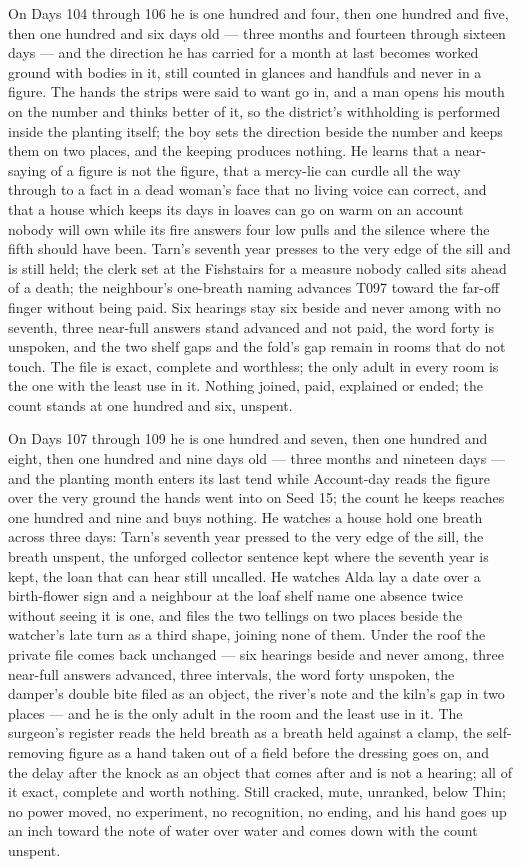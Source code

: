 \documentclass{design/chronicle}
\begin{document}
{On Days 104 through 106 he is one hundred and four, then one hundred and five, then one hundred and six days old — three months and fourteen through sixteen days — and the direction he has carried for a month at last becomes worked ground with bodies in it, still counted in glances and handfuls and never in a figure. The hands the strips were said to want go in, and a man opens his mouth on the number and thinks better of it, so the district’s withholding is performed inside the planting itself; the boy sets the direction beside the number and keeps them on two places, and the keeping produces nothing. He learns that a near-saying of a figure is not the figure, that a mercy-lie can curdle all the way through to a fact in a dead woman’s face that no living voice can correct, and that a house which keeps its days in loaves can go on warm on an account nobody will own while its fire answers four low pulls and the silence where the fifth should have been. Tarn’s seventh year presses to the very edge of the sill and is still held; the clerk set at the Fishstairs for a measure nobody called sits ahead of a death; the neighbour’s one-breath naming advances T097 toward the far-off finger without being paid. Six hearings stay six beside and never among with no seventh, three near-full answers stand advanced and not paid, the word forty is unspoken, and the two shelf gaps and the fold’s gap remain in rooms that do not touch. The file is exact, complete and worthless; the only adult in every room is the one with the least use in it. Nothing joined, paid, explained or ended; the count stands at one hundred and six, unspent.

On Days 107 through 109 he is one hundred and seven, then one hundred and eight, then one hundred and nine days old — three months and nineteen days — and the planting month enters its last tend while Account-day reads the figure over the very ground the hands went into on Seed 15; the count he keeps reaches one hundred and nine and buys nothing. He watches a house hold one breath across three days: Tarn’s seventh year pressed to the very edge of the sill, the breath unspent, the unforged collector sentence kept where the seventh year is kept, the loan that can hear still uncalled. He watches Alda lay a date over a birth-flower sign and a neighbour at the loaf shelf name one absence twice without seeing it is one, and files the two tellings on two places beside the watcher’s late turn as a third shape, joining none of them. Under the roof the private file comes back unchanged — six hearings beside and never among, three near-full answers advanced, three intervals, the word forty unspoken, the damper’s double bite filed as an object, the river’s note and the kiln’s gap in two places — and he is the only adult in the room and the least use in it. The surgeon’s register reads the held breath as a breath held against a clamp, the self-removing figure as a hand taken out of a field before the dressing goes on, and the delay after the knock as an object that comes after and is not a hearing; all of it exact, complete and worth nothing. Still cracked, mute, unranked, below Thin; no power moved, no experiment, no recognition, no ending, and his hand goes up an inch toward the note of water over water and comes down with the count unspent.

}
\end{document}
